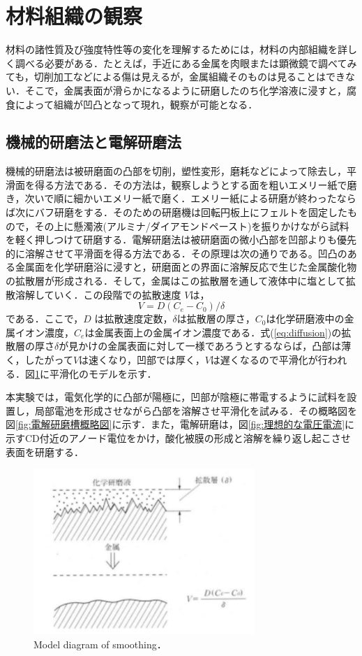 \section{材料組織の観察}
材料の諸性質及び強度特性等の変化を理解するためには，材料の内部組織を詳しく調べる必要がある．たとえば，手近にある金属を肉眼または顕微鏡で調べてみても，切削加工などによる傷は見えるが，金属組織そのものは見ることはできない．そこで，金属表面が滑らかになるように研磨したのち化学溶液に浸すと，腐食によって組織が凹凸となって現れ，観察が可能となる．

\subsection{機械的研磨法と電解研磨法}
機械的研磨法は被研磨面の凸部を切削，塑性変形，磨耗などによって除去し，平滑面を得る方法である．その方法は，観察しようとする面を粗いエメリー紙で磨き，次いで順に細かいエメリー紙で磨く．エメリー紙による研磨が終わったならば次にバフ研磨をする．そのための研磨機は回転円板上にフェルトを固定したもので，その上に懸濁液(アルミナ/ダイアモンドペースト)を振りかけながら試料を軽く押しつけて研磨する．電解研磨法は被研磨面の微小凸部を凹部よりも優先的に溶解させて平滑面を得る方法である．その原理は次の通りである。凹凸のある金属面を化学研磨浴に浸すと，研磨面との界面に溶解反応で生じた金属酸化物の拡散層が形成される．そして，金属はこの拡散層を通して液体中に塩として拡散溶解していく．この段階での拡散速度 $V$は，
\begin{equation}
    V = D(C_e - C_0)/\delta
    \label{eq:diffusion}
\end{equation}
である．ここで，$D$ は拡散速度定数，$\delta$は拡散層の厚さ，$C_0$は化学研磨液中の金属イオン濃度，$C_e$は金属表面上の金属イオン濃度である．式(\ref{eq:diffusion})の拡散層の厚さ$\delta$が見かけの金属表面に対して一様であろうとするならば，凸部は薄く，したがって$V$は速くなり，凹部では厚く，$V$は遅くなるので平滑化が行われる．図\ref{fig:平滑化のモデル}に平滑化のモデルを示す．

本実験では，電気化学的に凸部が陽極に，凹部が陰極に帯電するように試料を設置し，局部電池を形成させながら凸部を溶解させ平滑化を試みる．その概略図を図\ref{fig:電解研磨槽概略図}に示す．また，電解研磨は，図\ref{fig:理想的な電圧電流}に示すCD付近のアノード電位をかけ，酸化被膜の形成と溶解を繰り返し起こさせ表面を研磨する．

\begin{figure}[htbp]
    \centering %
    \includegraphics[width=100truemm,clip]{fig/fig_平滑化のモデル.png}
    \caption{Model diagram of smoothing．}
    \label{fig:平滑化のモデル}
\end{figure}

